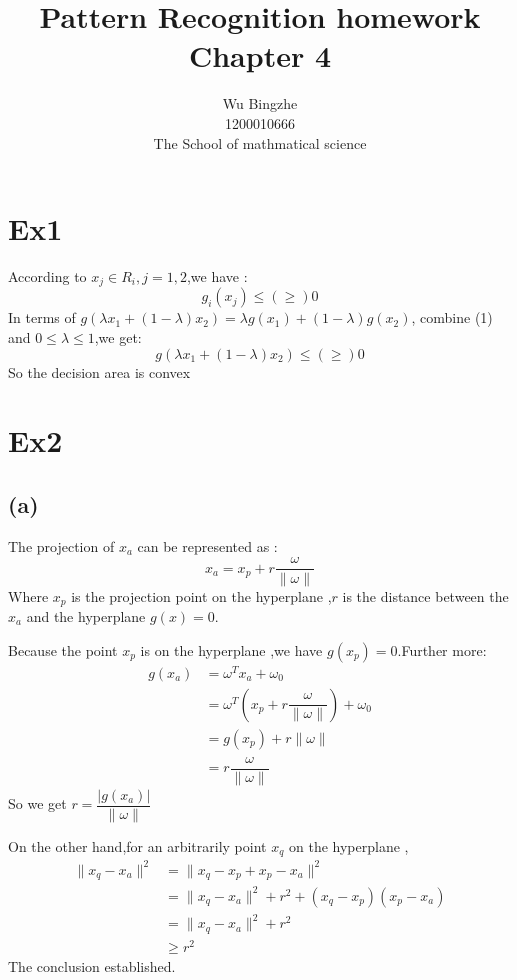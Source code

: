\documentclass[10pt,a4paper]{article}
\author{Wu Bingzhe\\1200010666\\The School of mathmatical science}
\title{Pattern Recognition homework\\Chapter 4}
\begin{document}
	\maketitle
	\section{Ex1}
	
	According to $x_j\in R_i,j=1,2$,we have :
	\begin{equation}
	g_i(x_j)\leq(\geq)0
	\end{equation}
	In terms of $g(\lambda x_1+(1-\lambda)x_2)=\lambda g(x_1)+(1-\lambda)g(x_2)$, combine (1) and $0\leq\lambda\leq 1$,we get:
	\begin{equation}
	g(\lambda x_1+(1-\lambda)x_2)\leq(\geq)0
	\end{equation}	
	So the decision area is convex 
	\section{Ex2}
	\subsection{(a)}
	The projection of $x_a$ can be represented as :
	\begin{equation}
	x_a=x_p+r\dfrac{\omega}{\|\omega\|}
	\end{equation}
	Where $x_p$ is the projection point on the hyperplane ,$r$ is the distance between the $x_a$ and
	the hyperplane $g(x)=0$.
	
	Because the point $x_p$ is on the hyperplane ,we have $g(x_p)=0$.Further more:
	\begin{equation*}
	\begin{split}
		g(x_a)&=\omega^Tx_a+\omega_0\\
		&=\omega^T(x_p+r\dfrac{\omega}{\|\omega\|})+\omega_0\\
		&=g(x_p)+r\|\omega\|\\
		&=r\dfrac{\omega}{\|\omega\|}
	\end{split}
	\end{equation*}
	So we get $r=\dfrac{|g(x_a)|}{\|\omega\|}$
	
	On the other hand,for an arbitrarily point $x_q$ on the hyperplane ,
	\begin{equation*}
	\begin{split}
	\|x_q-x_a\|^2&=\|x_q-x_p+x_p-x_a\|^2\\
	&=\|x_q-x_a\|^2+r^2+(x_q-x_p)(x_p-x_a)\\
	&=\|x_q-x_a\|^2+r^2\\
	&\geq r^2
	\end{split}
	\end{equation*}
	The conclusion established.
\end{document}
